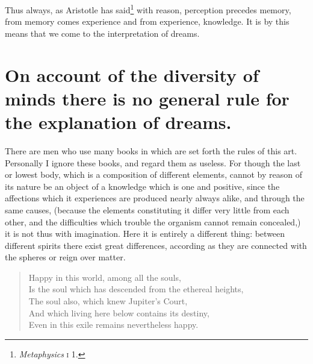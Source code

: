 \documentclass[12pt]{article}
\begin{document}
\noindent Thus always, as Aristotle has said\footnote{\textit{Metaphysics}
\textsc{i} 1.} with reason, perception precedes memory, from memory comes
experience and from experience, knowledge. It is by this means that we come to
the interpretation of dreams.


\section{On account of the diversity of minds there is no general rule for the
explanation of dreams.}

There are men who use many books in which are set forth the rules of this art.
Personally I ignore these books, and regard them as useless. For though the
last or lowest body, which is a composition of different elements, cannot by
reason of its nature be an object of a knowledge which is one and positive,
since the affections which it experiences are produced nearly always alike, and
through the same causes, (because the elements constituting it differ very
little from each other, and the difficulties which trouble the organism cannot
remain concealed,) it is not thus with imagination. Here it is entirely a
different thing: between different spirits there exist great differences,
according as they are connected with the spheres or reign over matter.

\begin{verse}
Happy in this world, among all the souls,\\
Is the soul which has descended from the ethereal heights,\\
The soul also, which knew Jupiter's Court,\\
And which living here below contains its destiny,\\
Even in this exile remains nevertheless happy.
\end{verse}
\end{document}
